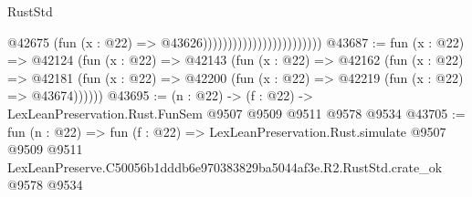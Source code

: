 \begin{lexlean}{RustStd}
\begin{coremodule}
                                                @42675
                                                  (fun (x : @22) => @43626))))))))))))))))))))))))
@43687 := fun (x : @22) =>
  @42124
    (fun (x : @22) =>
    @42143
      (fun (x : @22) =>
      @42162
        (fun (x : @22) =>
        @42181 (fun (x : @22) => @42200 (fun (x : @22) => @42219 (fun (x : @22) => @43674))))))
@43695 := (n : @22) -> (f : @22) -> LexLeanPreservation.Rust.FunSem @9507 @9509 @9511 @9578 @9534
@43705 := fun (n : @22) =>
  fun (f : @22) =>
  LexLeanPreservation.Rust.simulate
    @9507
    @9509
    @9511
    LexLeanPreserve.C50056b1dddb6e970383829ba5044af3e.R2.RustStd.crate_ok
    @9578
    @9534
\end{coremodule}
\end{lexlean}
